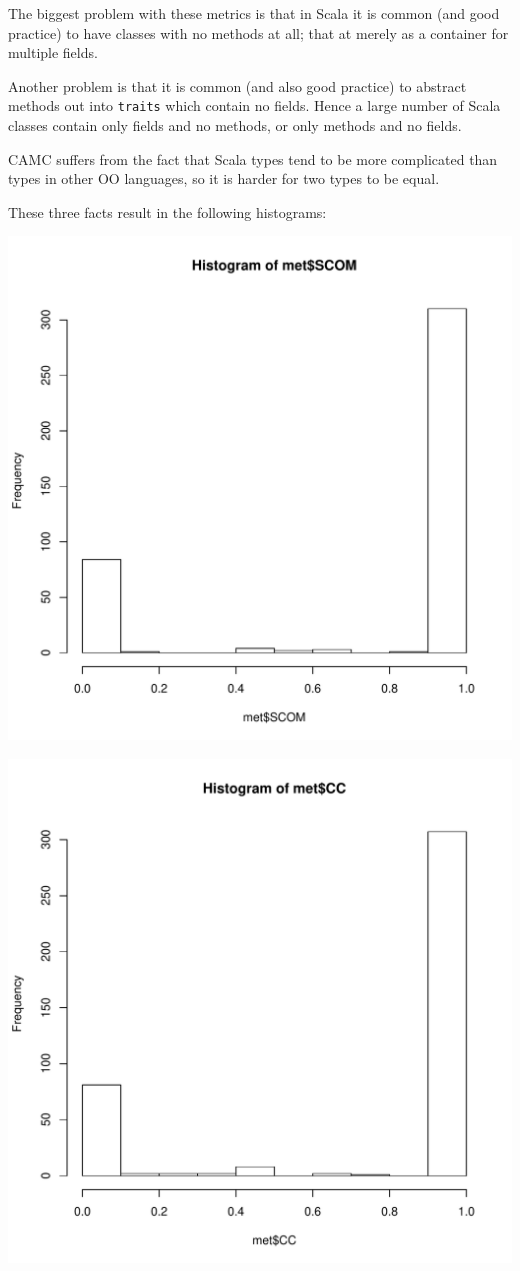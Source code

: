 \documentclass[a4paper]{article}
\begin{document}
The biggest problem with these metrics is that in Scala it is common (and good
practice) to have classes with no methods at all; that at merely as a container
for multiple fields.

Another problem is that it is common (and also good practice) to abstract
methods out into \texttt{traits} which contain no fields. Hence a large number of Scala
classes contain only fields and no methods, or only methods and no fields.

CAMC suffers from the fact that Scala types tend to be more complicated than
types in other OO languages, so it is harder for two types to be equal.

These three facts result in the following histograms:

\includegraphics[width=0.800\linewidth]{SCOM.pdf}

\includegraphics[width=0.800\linewidth]{CC.pdf}
\end{document}
